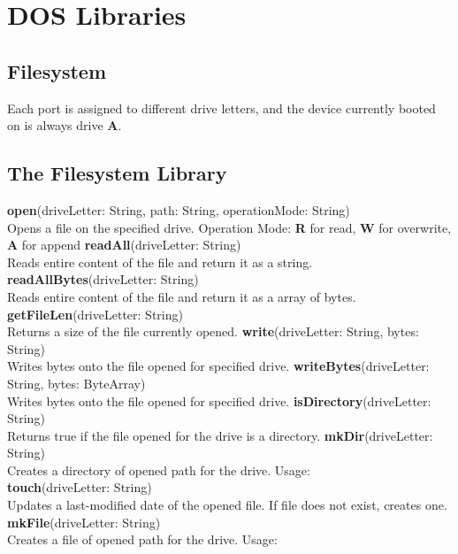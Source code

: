 \chapter{DOS Libraries}

\section{Filesystem}

Each port is assigned to different drive letters, and the device currently booted on is always drive \textbf{A}.

\section{The Filesystem Library}


\begin{outline}
\1\textbf{open}(driveLetter: String, path: String, operationMode: String)
\\Opens a file on the specified drive.
 \2Operation Mode: \textbf{R} for read, \textbf{W} for overwrite, \textbf{A} for append
\1\textbf{readAll}(driveLetter: String)
\\Reads entire content of the file and return it as a string.
\1\textbf{readAllBytes}(driveLetter: String)
\\Reads entire content of the file and return it as a array of bytes.
\1\textbf{getFileLen}(driveLetter: String)
\\Returns a size of the file currently opened.
\1\textbf{write}(driveLetter: String, bytes: String)
\\Writes bytes onto the file opened for specified drive.
\1\textbf{writeBytes}(driveLetter: String, bytes: ByteArray)
\\Writes bytes onto the file opened for specified drive.
\1\textbf{isDirectory}(driveLetter: String)
\\Returns true if the file opened for the drive is a directory.
\1\textbf{mkDir}(driveLetter: String)
\\Creates a directory of opened path for the drive. Usage:
\\
\1\textbf{touch}(driveLetter: String)
\\Updates a last-modified date of the opened file. If file does not exist, creates one.
\1\textbf{mkFile}(driveLetter: String)
\\Creates a file of opened path for the drive. Usage:
\\
\end{outline}



